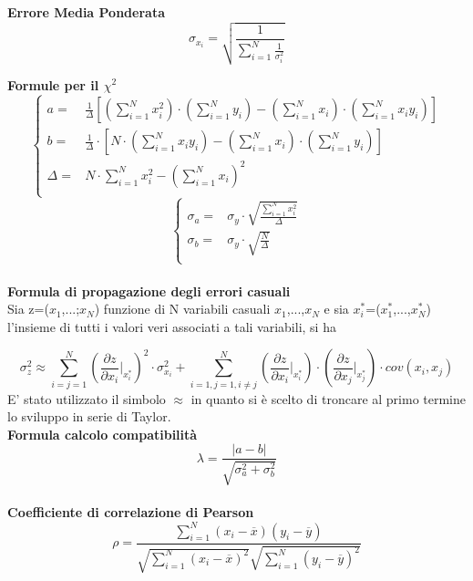 \documentclass[a4paper,11pt,oneside]{article}
\begin{document}
\textbf{Errore Media Ponderata}
\begin{equation*}
\label{eq:errore_media_pond}
     \sigma_{x_i}=\sqrt{\frac{1}{\sum_{i=1}^{N}\frac{1}{\sigma_{i}^{2}}}}
\end{equation*}

\textbf{Formule per il ${\chi}^2$}
\begin{equation*}
        \begin{cases}
    a=&\frac{1}{\Delta}[(\sum\limits_{i=1}^{N}{x_{i}^{2}})\cdot(\sum\limits_{i=1}^{N}{y_{i}})-(\sum\limits_{i=1}^{N}{x_{i}})\cdot(\sum\limits_{i=1}^{N}{x_{i}y_{i}})] \\ 
    b=&\frac{1}{\Delta }\cdot \left [N\cdot \left ( \sum\limits_{i=1}^{N}x_i y_i \right )-\left ( \sum\limits_{i=1}^{N}x_i \right )\cdot \left ( \sum\limits_{i=1}^{N}y_i \right )  \right ]\\
    \Delta=& N\cdot \sum\limits_{i=1}^{N} x_i^{2} - \left ( \sum\limits_{i=1}^{N}x_i \right )^{2}\\
    \end{cases}
\end{equation*}
\begin{equation*}
    \begin{cases}
    \sigma_{a}=&\sigma_{y}\cdot\sqrt{\frac{\sum_{i=1}^{N}{x_{i}^{2}}}{\Delta}} \\
    \sigma_{b}=&\sigma_y\cdot \sqrt{\frac{N}{\Delta }}\\
    \end{cases}
    \label{equation:err_chi_quadro}
\end{equation*}
\\
\textbf{Formula di propagazione degli errori casuali}\\

Sia z=($x_1$,...;$x_N$) funzione di N variabili casuali $x_1$,...,$x_N$ e sia ${x_i^\ast}$=($x_1^\ast$,...,$x_N^{\ast}$) l'insieme di tutti i valori veri associati a tali variabili, si ha 

\begin{equation*}
    \sigma_z^{2}\approx  \sum_{i=j=1}^{N}\left ( \frac{\partial z}{\partial x_i}\Big|_{x_i^{\ast}} \right )^{2}\cdot\sigma_{x_i}^{2} +\sum_{i=1,j=1,i\neq j}^{N}\left (\frac{\partial z }{\partial x_i}\Big|_{x_i^{\ast}} \right ) \cdot \left ( \frac{\partial z}{\partial x_j} \Big|_{x_j^{\ast}} \right )\cdot cov(x_i,x_j)\label{eq:prop_errori}
\end{equation*}
E' stato utilizzato il simbolo $\approx$ in quanto si è scelto di troncare al primo termine lo sviluppo in serie di Taylor.\\


\textbf{Formula calcolo compatibilità}\\
\begin{equation*}
    \lambda=\frac{\left|a-b\right|}{\sqrt{\sigma^{2}_{a}+\sigma^{2}_{b}}}
\end{equation*}\\
\textbf{Coefficiente di correlazione di Pearson}\\
\begin{equation*}
    \rho=  \frac{\sum_{i=1}^{N}(x_i - \overline{x}
    )(y_i - \overline{y})}{\sqrt{\sum_{i=1}^{N}(x_i -\overline{x})^2}\sqrt{\sum_{i=1}^{N}(y_i - \overline{y})^2}}
\end{equation*}
\end{document}
